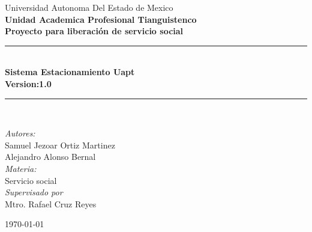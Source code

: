 \begin{titlepage}
	\begin{center}
		{Universidad Autonoma Del Estado de Mexico\\[0.2cm]
			\textbf{Unidad Academica Profesional Tianguistenco}}\\[0.2cm]
		\vspace{2cm}
		{\large \textbf{Proyecto para liberación de servicio  social}}\\[0.6cm]
		
		\rule{\linewidth}{0.5mm} \\[0.1cm]
		{ \huge \bfseries  Sistema Estacionamiento Uapt\\
			Version:1.0
			\\[0.1cm] }
		\rule{\linewidth}{0.5mm} \\[1.5cm]
		
		\noindent
		
		{\Large  \emph{Autores:}}\\[0.3cm]
		{\large  
Samuel Jezoar Ortiz Martinez \\[0.2cm]
Alejandro Alonso Bernal} \\[1cm]  
		
		{\Large  \emph{Materia:}}\\[0.3cm]
		{\large Servicio social} \\[1cm]
		
		{\Large  \emph{Supervisado por  }}\\[0.3cm]
		{\large  Mtro. Rafael Cruz Reyes}
		
		\vspace{3cm}
{\today}
	\end{center}
\end{titlepage}